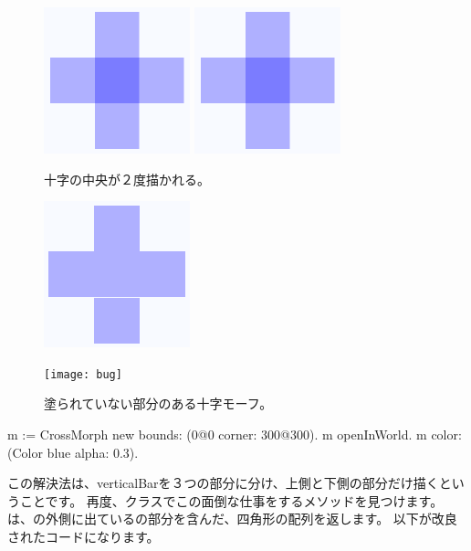 \documentclass[a4paper,10pt,twoside]{book}
\begin{document}
\begin{figure}[t]
\begin{minipage}{0.48\textwidth}
	\ifluluelse
		{\centerline{\includegraphics[scale=0.6]{overdrawBug}}}
		{\centerline{\includegraphics{overdrawBug}}}
	\caption{十字の中央が２度描かれる。
		}
\end{minipage}
\hfill
\begin{minipage}{0.48\textwidth}
	\ifluluelse
		{\centerline{\includegraphics[scale=0.6]{hairlineBug}}}
		{\centerline{\texttt{[image: bug]}}}
	\caption{塗られていない部分のある十字モーフ。
		}
\end{minipage}
\end{figure}


\begin{code}{}
m := CrossMorph new bounds: (0@0 corner: 300@300).
m openInWorld.
m color: (Color blue alpha: 0.3).
\end{code}

\noindent
この解決法は、verticalBarを３つの部分に分け、上側と下側の部分だけ描くということです。
再度、クラスでこの面倒な仕事をするメソッドを見つけます。は、の外側に出ているの部分を含んだ、四角形の配列を返します。
以下が改良されたコードになります。
\end{document}
